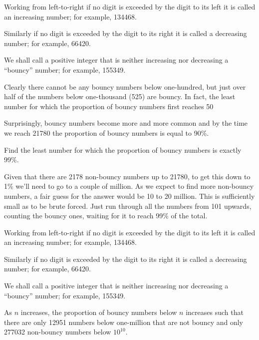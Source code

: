 

\ans{---}



Working from left-to-right if no digit is exceeded by the digit to its left it is called an increasing number; for example, 134468.

Similarly if no digit is exceeded by the digit to its right it is called a decreasing number; for example, 66420.

We shall call a positive integer that is neither increasing nor decreasing a ``bouncy'' number; for example, 155349.

Clearly there cannot be any bouncy numbers below one-hundred, but just over half of the numbers below one-thousand (525) are bouncy. In fact, the least number for which the proportion of bouncy numbers first reaches 50%

Surprisingly, bouncy numbers become more and more common and by the time we reach 21780 the proportion of bouncy numbers is equal to 90\%.

Find the least number for which the proportion of bouncy numbers is exactly 99\%.

Given that there are 2178 non-bouncy numbers up to 21780, to get this down to 1\% we'll need to go to a couple of million.  As we expect to find more non-bouncy numbers, a fair guess for the answer would be 10 to 20 million.  This is sufficiently small as to be brute forced.  Just run through all the numbers from 101 upwards, counting the bouncy ones, waiting for it to reach 99\% of the total.




Working from left-to-right if no digit is exceeded by the digit to its left it is called an increasing number; for example, 134468.

Similarly if no digit is exceeded by the digit to its right it is called a decreasing number; for example, 66420.

We shall call a positive integer that is neither increasing nor decreasing a ``bouncy'' number; for example, 155349.

As $n$ increases, the proportion of bouncy numbers below $n$ increases such that there are only 12951 numbers below one-million that are not bouncy and only 277032 non-bouncy numbers below $10^{10}$.

